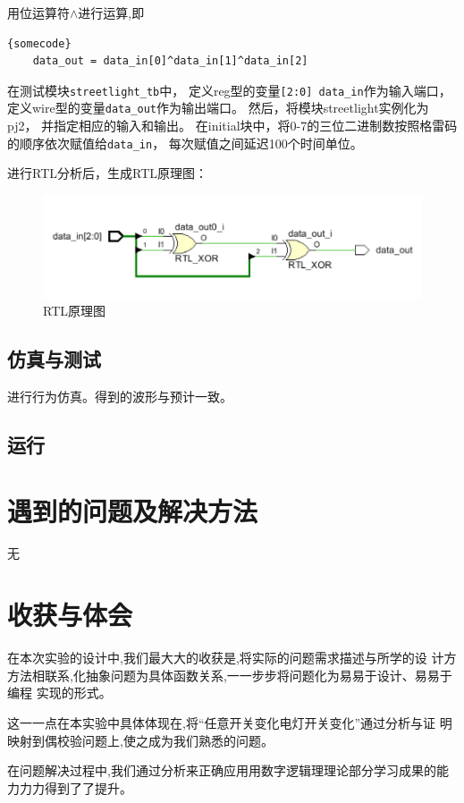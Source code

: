 \documentclass[UTF8]{article}
\begin{document}
用位运算符$\wedge$进行运算,即
\lstset{language=verilog}
\begin{lstlisting}[frame=tb]{somecode}
    data_out = data_in[0]^data_in[1]^data_in[2]
\end{lstlisting}

在测试模块\lstinline{streetlight_tb}中，
定义reg型的变量\lstinline{[2:0] data_in}作为输入端口，
定义wire型的变量\lstinline{data_out}作为输出端口。
然后，将模块streetlight实例化为pj2，
并指定相应的输入和输出。
在initial块中，将0-7的三位二进制数按照格雷码的顺序依次赋值给\lstinline{data_in}，
每次赋值之间延迟100个时间单位。

进行RTL分析后，生成RTL原理图：
​
\begin{figure}[htbp]
    \centering
    \includegraphics[scale=0.7]{0.png}
    \caption{RTL原理图}
\end{figure}

\subsection{仿真与测试}
进行行为仿真。得到的波形与预计一致。
\subsection{运行}

\section{遇到的问题及解决方法}
无
\section{收获与体会}

在本次实验的设计中,我们最大大的收获是,将实际的问题需求描述与所学的设
计方方法相联系,化抽象问题为具体函数关系,一一步步将问题化为易易于设计、易易于编程
实现的形式。

这一一点在本实验中具体体现在,将“任意开关变化电灯开关变化”通过分析与证
明映射到偶校验问题上,使之成为我们熟悉的问题。

在问题解决过程中,我们通过分析来正确应用用数字逻辑理理论部分学习成果的能
力力力得到了了提升。
\end{document}
